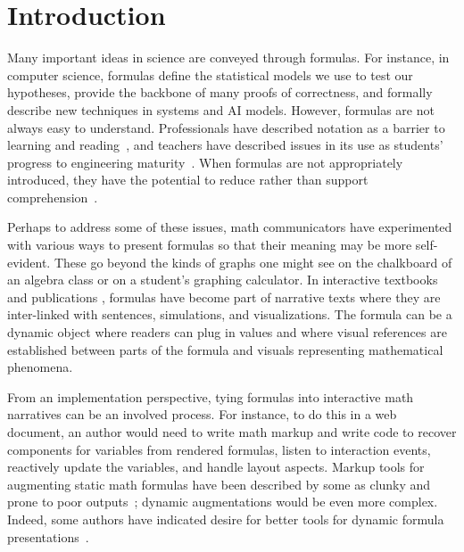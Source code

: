 \section{Introduction}\label{intro}

Many important ideas in science are conveyed through formulas. For instance, in computer science, formulas define the statistical models we use to test our hypotheses, provide the backbone of many proofs of correctness, and formally describe new techniques in systems and AI models. However, formulas are not always easy to understand. Professionals have described notation as a barrier to learning and reading~\cite{Cai2019-lb,ref:mysore2023how}, and teachers have described issues in its use as students' progress to engineering maturity~\cite{faulkner2019mathematical}. When formulas are not appropriately introduced, they have the potential to reduce rather than support comprehension~\cite{Osterholm2006-al,leung1997learning}.

Perhaps to address some of these issues, math communicators have experimented with various ways to present formulas so that their meaning may be more self-evident. These go beyond the kinds of graphs one might see on the chalkboard of an algebra class or on a student's graphing calculator. In interactive textbooks \cite{margalit2019interactive, poncecampuzano2019complex} and publications \cite{distill2017}, formulas have become part of narrative texts where they are inter-linked with sentences, simulations, and visualizations. The formula can be a dynamic object where readers can plug in values and where visual references are established between parts of the formula and visuals representing mathematical phenomena.

From an implementation perspective, tying formulas into interactive math narratives can be an involved process. For instance, to do this in a web document, an author would need to write math markup and write code to recover components for variables from rendered formulas, listen to interaction events, reactively update the variables, and handle layout aspects. Markup tools for augmenting static math formulas have been described by some as clunky and prone to poor outputs~\cite{Head2022-ws}; 
dynamic augmentations would be even more complex. Indeed, some authors have indicated desire for better tools for dynamic formula presentations~\cite{Head2022-ws}.


